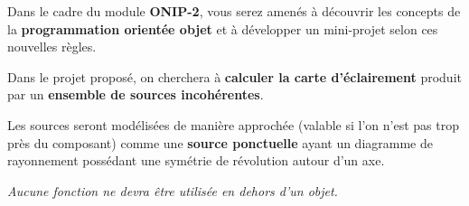 
Dans le cadre du module \textbf{ONIP-2}, vous serez amenés à découvrir les concepts de la \textbf{programmation orientée objet} et à développer un  mini-projet selon ces nouvelles règles.

Dans le projet proposé, on cherchera à \textbf{calculer la carte d'éclairement} produit par un \textbf{ensemble de sources incohérentes}.

Les sources seront modélisées de manière approchée (valable si l'on n'est pas trop près du composant) comme une \textbf{source ponctuelle} ayant un diagramme de rayonnement possédant une symétrie de révolution autour d'un axe.

\textit{Aucune fonction ne devra être utilisée en dehors d'un objet.}